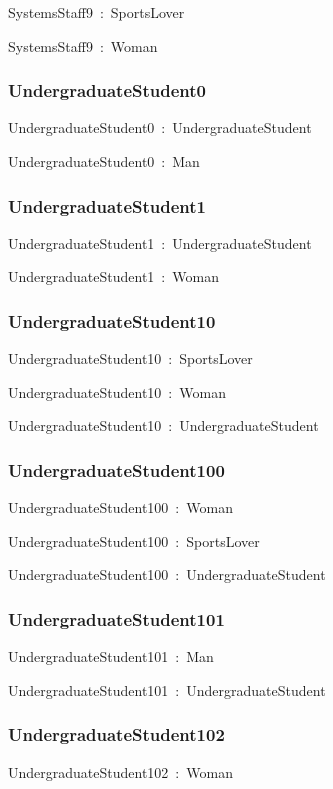 \documentclass{article}
\begin{document}
SystemsStaff9~:~SportsLover

SystemsStaff9~:~Woman

\subsubsection*{UndergraduateStudent0}

UndergraduateStudent0~:~UndergraduateStudent

UndergraduateStudent0~:~Man

\subsubsection*{UndergraduateStudent1}

UndergraduateStudent1~:~UndergraduateStudent

UndergraduateStudent1~:~Woman

\subsubsection*{UndergraduateStudent10}

UndergraduateStudent10~:~SportsLover

UndergraduateStudent10~:~Woman

UndergraduateStudent10~:~UndergraduateStudent

\subsubsection*{UndergraduateStudent100}

UndergraduateStudent100~:~Woman

UndergraduateStudent100~:~SportsLover

UndergraduateStudent100~:~UndergraduateStudent

\subsubsection*{UndergraduateStudent101}

UndergraduateStudent101~:~Man

UndergraduateStudent101~:~UndergraduateStudent

\subsubsection*{UndergraduateStudent102}

UndergraduateStudent102~:~Woman
\end{document}
